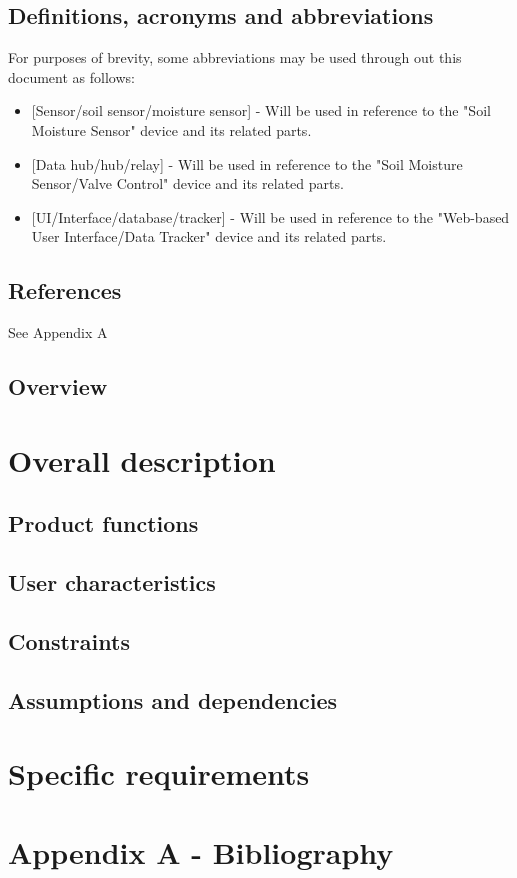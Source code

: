 \documentclass[onecolumn, draftclsnofoot,10pt, compsoc]{IEEEtran}
\begin{document}
	\subsection{Definitions, acronyms and abbreviations}
	For purposes of brevity, some abbreviations may be used through out this document as follows:
	\begin{itemize}
		\item{[Sensor/soil sensor/moisture sensor] - Will be used in reference to the "Soil Moisture Sensor" device and its related parts.}
		\item{[Data hub/hub/relay] - Will be used in reference to the "Soil Moisture Sensor/Valve Control" device and its related parts.}
		\item{[UI/Interface/database/tracker] - Will be used in reference to the "Web-based User Interface/Data Tracker" device and its related parts.}
	\end{itemize}
	\subsection{References}
	See Appendix A
	\subsection{Overview}
	
	\section{Overall description}
	
	
	\subsection{Product functions}
	\subsection{User characteristics}
	\subsection{Constraints}
	\subsection{Assumptions and dependencies}
	\section{Specific requirements}

	
	\newpage
	\section{Appendix A - Bibliography}
	\nocite{*} %
	
	
	
\end{document}
